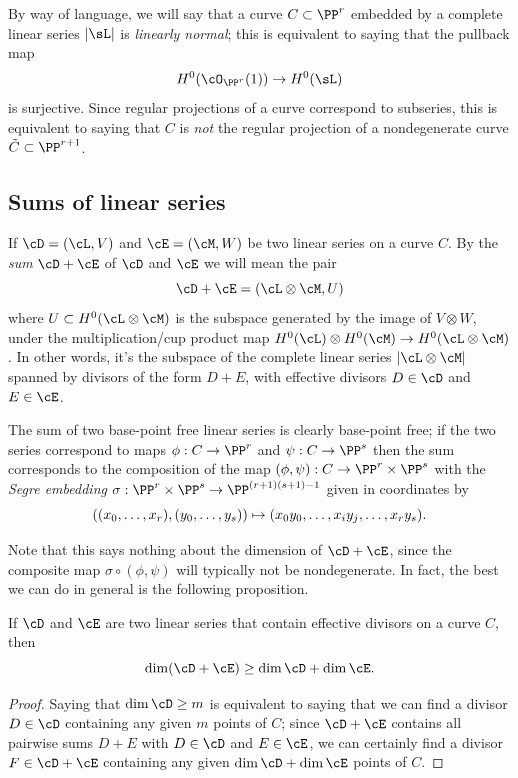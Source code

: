 By way of language, we will say that a curve $C \subset \PP^r$
embedded by a complete linear series $|\sL|$ is 
\emph{linearly normal};
%
this is equivalent to saying that the pullback map
$$
H^0(\cO_{\PP^r}(1)) \to H^0(\sL)
$$
is surjective. Since regular projections of a curve correspond to subseries, this is equivalent to saying that $C$ is \emph{not} the regular  projection of a nondegenerate curve $\tilde C \subset \PP^{r+1}$. 

\subsection*{Sums of linear series}
If
$\cD = (\cL,V)$ and $\cE = (\cM, W)$ be two linear series on a curve
$C$. By the
\emph{sum}
%
$\cD + \cE$ of $\cD$ and $\cE$
 we will mean the pair 
$$
\cD + \cE = (\cL \otimes \cM, U) 
$$
where $U \subset H^0(\cL \otimes \cM)$ is the subspace generated by
the image of $V \otimes W$, under the multiplication/cup product map
$H^0(\cL) \otimes H^0(\cM) \to H^0(\cL \otimes \cM)$. In other words,
it's the subspace of the complete linear series $|\cL\otimes \cM|$
spanned by divisors of the form $D+E$, with effective divisors $D \in
\cD$ and $E \in \cE$.
 
The sum of two base-point free linear series is clearly base-point free; if the two series correspond to maps
$\phi:C\to \PP^r$ and $\psi:C\to \PP^s$ then the sum corresponds to the composition of the map
$(\phi, \psi): C\to \PP^r\times \PP^s$ with the 
\emph{Segre embedding} 
% 
$\sigma : \PP^r\times \PP^s \to \PP^{(r+1)(s+1)-1}$
given in coordinates by
$$
((x_0,\dots, x_r), (y_0, \dots, y_s))\mapsto (x_0y_0, \dots, x_iy_j, \dots, x_ry_s).
\vspace*{-\parskip}
$$

Note that this says nothing about the dimension of $\cD + \cE$, since the composite map $\sigma \circ (\phi, \psi)$ will typically not be nondegenerate. In fact, the best we can do in general is the following proposition.


\begin{proposition}\label{sum of linear series}
 If $\cD$ and $\cE$ are two  linear series that contain effective divisors on a curve $C$, then
$$
\dim(\cD + \cE) \geq \dim \cD + \dim \cE.
\vspace*{-\parskip}
$$
\end{proposition}

\begin{proof}
Saying that
$\dim \cD \geq m$ is equivalent to saying that we can find a divisor
$D \in \cD$ containing any given $m$ points of $C$; since $\cD + \cE$
contains all pairwise sums $D + E$ with $D \in \cD$ and $E \in \cE$,
we can certainly find a divisor $F \in \cD + \cE$ containing any given
$\dim \cD + \dim \cE$ points of $C$. 
\end{proof}

